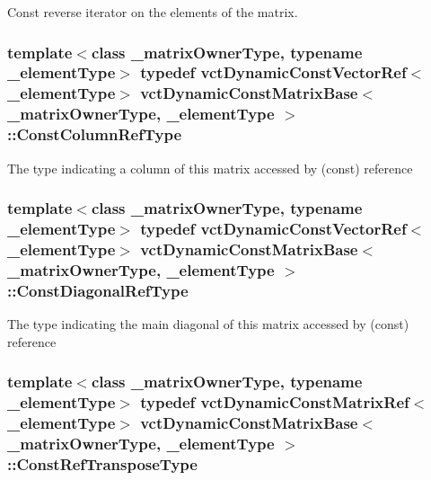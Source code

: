 Const reverse iterator on the elements of the matrix. \hypertarget{classvct_dynamic_const_matrix_base_ac8caf37f979246b1ae99d6e6876879e0}{
\subsubsection[{Const\-Column\-Ref\-Type}]{\setlength{\rightskip}{0pt plus 5cm}template$<$class \-\_\-matrix\-Owner\-Type, typename \-\_\-element\-Type$>$ typedef {\bf vct\-Dynamic\-Const\-Vector\-Ref}$<$\-\_\-element\-Type$>$ {\bf vct\-Dynamic\-Const\-Matrix\-Base}$<$ \-\_\-matrix\-Owner\-Type, \-\_\-element\-Type $>$\-::{\bf Const\-Column\-Ref\-Type}}}\label{classvct_dynamic_const_matrix_base_ac8caf37f979246b1ae99d6e6876879e0}
The type indicating a column of this matrix accessed by (const) reference \hypertarget{classvct_dynamic_const_matrix_base_aa497314340719c9e70a4991d3f306d7e}{
\subsubsection[{Const\-Diagonal\-Ref\-Type}]{\setlength{\rightskip}{0pt plus 5cm}template$<$class \-\_\-matrix\-Owner\-Type, typename \-\_\-element\-Type$>$ typedef {\bf vct\-Dynamic\-Const\-Vector\-Ref}$<$\-\_\-element\-Type$>$ {\bf vct\-Dynamic\-Const\-Matrix\-Base}$<$ \-\_\-matrix\-Owner\-Type, \-\_\-element\-Type $>$\-::{\bf Const\-Diagonal\-Ref\-Type}}}\label{classvct_dynamic_const_matrix_base_aa497314340719c9e70a4991d3f306d7e}
The type indicating the main diagonal of this matrix accessed by (const) reference \hypertarget{classvct_dynamic_const_matrix_base_a2ee053ef5a591f470076e2a0c215fa44}{
\subsubsection[{Const\-Ref\-Transpose\-Type}]{\setlength{\rightskip}{0pt plus 5cm}template$<$class \-\_\-matrix\-Owner\-Type, typename \-\_\-element\-Type$>$ typedef {\bf vct\-Dynamic\-Const\-Matrix\-Ref}$<$\-\_\-element\-Type$>$ {\bf vct\-Dynamic\-Const\-Matrix\-Base}$<$ \-\_\-matrix\-Owner\-Type, \-\_\-element\-Type $>$\-::{\bf Const\-Ref\-Transpose\-Type}}}\label{classvct_dynamic_const_matrix_base_a2ee053ef5a591f470076e2a0c215fa44}

